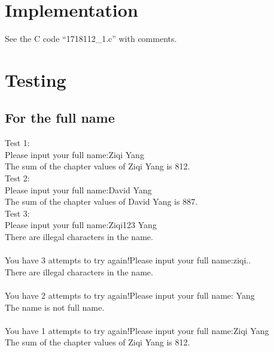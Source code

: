 \documentclass[12pt]{article}
\begin{document}
	\section{Implementation}
	See the C code “1718112\_1.c” with comments.
	
	\section{Testing}
	
	\subsection{For the full name}
	\noindent Test 1:\\
	Please input your full name:Ziqi Yang\\
	The sum of the chapter values of Ziqi Yang is 812.\\
	
	\noindent Test 2:\\
	Please input your full name:David Yang\\
	The sum of the chapter values of David Yang is 887.\\
	
	\noindent Test 3:\\
	Please input your full name:Ziqi123 Yang\\
	There are illegal characters in the name.\\\\
	You have 3 attempts to try again!Please input your full name:ziqi..\\
	There are illegal characters in the name.\\\\
	You have 2 attempts to try again!Please input your full name:   Yang\\
	The name is not full name.\\\\	
	You have 1 attempts to try again!Please input your full name:Ziqi Yang\\
	The sum of the chapter values of Ziqi Yang is 812.\\
	
\end{document}
